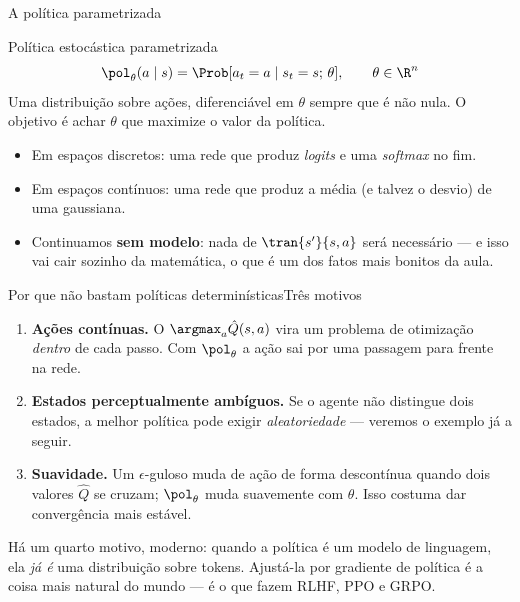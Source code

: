 \documentclass[aspectratio=169, 11pt]{beamer}
\newcommand{\thv}{\theta}                       %
\newcommand{\polth}{\pol_{\thv}}                %
\newcommand{\Qhat}{\hat{Q}}
\begin{document}
\begin{frame}{A política parametrizada}

  \begin{defbox}{Política estocástica parametrizada}
    \[
      \polth(a \mid s) = \Prob[a_t = a \mid s_t = s;\, \thv],
      \qquad \thv \in \R^{n}
    \]
    Uma distribuição sobre ações, diferenciável em $\thv$ sempre que é não
    nula. O objetivo é achar $\thv$ que maximize o valor da política.
  \end{defbox}

  \begin{itemize}\setlength{\itemsep}{0.4ex}
    \item Em espaços discretos: uma rede que produz \emph{logits} e uma
      \emph{softmax} no fim.
    \item Em espaços contínuos: uma rede que produz a média (e talvez o
      desvio) de uma gaussiana.
    \item Continuamos \textbf{sem modelo}: nada de $\tran{s'}{s,a}$ será
      necessário --- e isso vai cair sozinho da matemática, o que é um dos
      fatos mais bonitos da aula.
  \end{itemize}
\end{frame}

\begin{frame}{Por que não bastam políticas determinísticas}{Três motivos}

  \begin{enumerate}\setlength{\itemsep}{0.55ex}
    \item \textbf{Ações contínuas.} O $\argmax_a \Qhat(s,a)$ vira um problema
      de otimização \emph{dentro} de cada passo. Com $\polth$ a ação sai por
      uma passagem para frente na rede.
    \item \textbf{Estados perceptualmente ambíguos.} Se o agente não
      distingue dois estados, a melhor política pode exigir
      \emph{aleatoriedade} --- veremos o exemplo já a seguir.
    \item \textbf{Suavidade.} Um $\epsilon$-guloso muda de ação de forma
      descontínua quando dois valores $\Qhat$ se cruzam; $\polth$ muda
      suavemente com $\thv$. Isso costuma dar convergência mais estável.
  \end{enumerate}

  \begin{ideiabox}
    Há um quarto motivo, moderno: quando a política é um modelo de linguagem,
    ela \emph{já é} uma distribuição sobre tokens. Ajustá-la por gradiente de
    política é a coisa mais natural do mundo --- é o que fazem RLHF, PPO e
    GRPO.
  \end{ideiabox}
\end{frame}
\end{document}

